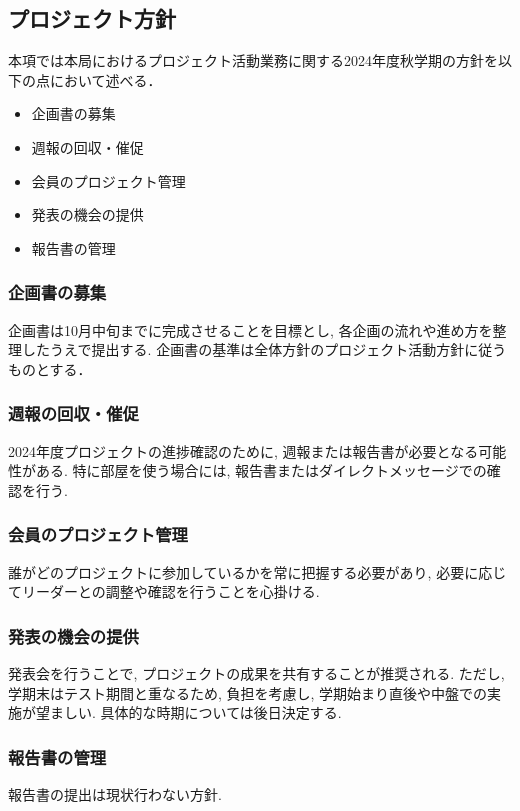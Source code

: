 \subsection*{プロジェクト方針}


本項では本局におけるプロジェクト活動業務に関する2024年度秋学期の方針を以下の点において述べる．

\begin{itemize}
  \item 企画書の募集
  \item 週報の回収・催促
  \item 会員のプロジェクト管理
  \item 発表の機会の提供
  \item 報告書の管理
\end{itemize}

\subsubsection*{企画書の募集}

企画書は10月中旬までに完成させることを目標とし, 各企画の流れや進め方を整理したうえで提出する.
企画書の基準は全体方針のプロジェクト活動方針に従うものとする．

\subsubsection*{週報の回収・催促}
2024年度プロジェクトの進捗確認のために, 週報または報告書が必要となる可能性がある.
特に部屋を使う場合には, 報告書またはダイレクトメッセージでの確認を行う.

\subsubsection*{会員のプロジェクト管理}

誰がどのプロジェクトに参加しているかを常に把握する必要があり, 必要に応じてリーダーとの調整や確認を行うことを心掛ける.

\subsubsection*{発表の機会の提供}

発表会を行うことで, プロジェクトの成果を共有することが推奨される.
ただし, 学期末はテスト期間と重なるため, 負担を考慮し, 学期始まり直後や中盤での実施が望ましい. 具体的な時期については後日決定する.


\subsubsection*{報告書の管理}

報告書の提出は現状行わない方針.
